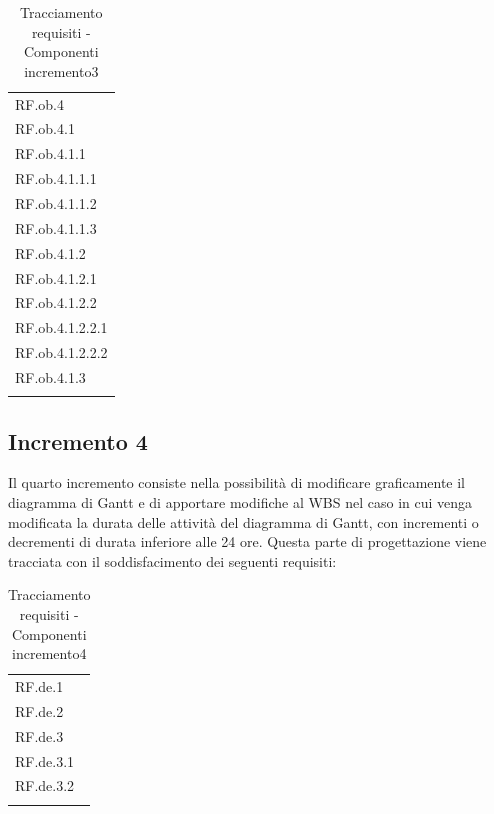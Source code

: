 \begin{longtable}{|>{\centering}p{3cm}|}
    \hline
    \multicolumn{1}{|c|}{\textbf{Requisiti}} \\ %
      \hline
        RF.ob.4 \tabularnewline \hline
		RF.ob.4.1 \tabularnewline \hline
		RF.ob.4.1.1 \tabularnewline \hline		
		RF.ob.4.1.1.1 \tabularnewline \hline
		RF.ob.4.1.1.2 \tabularnewline \hline
		RF.ob.4.1.1.3 \tabularnewline \hline
		RF.ob.4.1.2 \tabularnewline \hline
		RF.ob.4.1.2.1 \tabularnewline \hline
		RF.ob.4.1.2.2 \tabularnewline \hline
		RF.ob.4.1.2.2.1 \tabularnewline \hline
		RF.ob.4.1.2.2.2 \tabularnewline \hline
		RF.ob.4.1.3 \tabularnewline \hline
    \caption{Tracciamento requisiti - Componenti incremento3}
    \label{tab:Tracciamento requisiti - Componenti incremento3}
\end{longtable}
	
\subsection{Incremento 4}
Il quarto incremento consiste nella possibilit\`{a} di modificare graficamente il diagramma di Gantt e di apportare modifiche al WBS nel caso in cui venga modificata la durata delle attivit\`{a} del diagramma di Gantt, con incrementi o decrementi di durata inferiore alle 24 ore. Questa parte di progettazione viene tracciata con il soddisfacimento dei seguenti requisiti:

\begin{longtable}{|>{\centering}p{3cm}|}
    \hline
    \multicolumn{1}{|c|}{\textbf{Requisiti}} \\ %
      \hline
        RF.de.1 \tabularnewline \hline
		RF.de.2 \tabularnewline \hline
		RF.de.3 \tabularnewline \hline
		RF.de.3.1 \tabularnewline \hline
		RF.de.3.2 \tabularnewline \hline
    \caption{Tracciamento requisiti - Componenti incremento4}
    \label{tab:Tracciamento requisiti - Componenti incremento4}
\end{longtable}